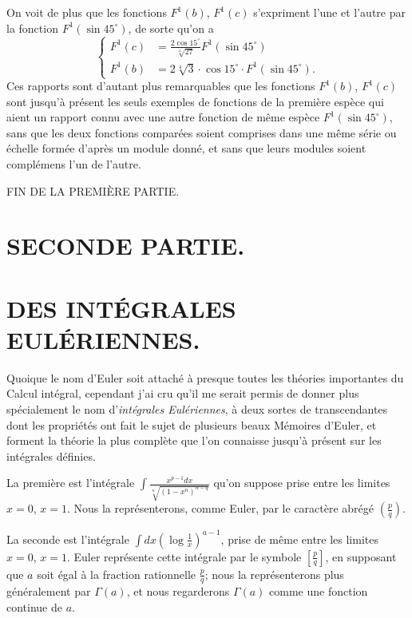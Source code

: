 \documentclass{article}
\begin{document}
On voit de plus que les fonctions $F^{1}(b)$, $F^{1}(c)$ s'expriment l'une et l'autre par la fonction $F^{1}(\sin 45^{\circ})$, de sorte qu'on a
\[ \left\{\begin{aligned} F^{1}(c)&=\frac{2\cos 15^{\circ}}{\sqrt[4]{27}}F^{1}(\sin 45^{\circ})\\ F^{1}(b)&=2\sqrt[4]{3}\cdot\cos 15^{\circ}\cdot F^{1}(\sin 45^{\circ}). \end{aligned}\right. \]
Ces rapports sont d'autant plus remarquables que les fonctions $F^{1}(b)$, $F^{1}(c)$ sont jusqu'à présent les seuls exemples de fonctions de la première espèce qui aient un rapport connu avec une autre fonction de même espèce $F^{1}(\sin 45^{\circ})$, sans que les deux fonctions comparées soient comprises dans une même série ou échelle formée d'après un module donné, et sans que leurs modules soient complémens l'un de l'autre.

FIN DE LA PREMIÈRE PARTIE.


\section*{SECONDE PARTIE.}

\section*{DES INTÉGRALES EULÉRIENNES.}

Quoique le nom d'Euler soit attaché à presque toutes les théories importantes du Calcul intégral, cependant j'ai cru qu'il me serait permis de donner plus spécialement le nom d'\emph{intégrales Eulériennes}, à deux sortes de transcendantes dont les propriétés ont fait le sujet de plusieurs beaux Mémoires d'Euler, et forment la théorie la plus complète que l'on connaisse jusqu'à présent sur les intégrales définies.

La première est l'intégrale $\displaystyle\int\frac{x^{p-1}dx}{\sqrt[n]{(1-x^{n})^{n-q}}}$ qu'on suppose prise entre les limites $x=0$, $x=1$. Nous la représenterons, comme Euler, par le caractère abrégé $\left(\frac{p}{q}\right)$.

La seconde est l'intégrale $\displaystyle\int dx\left(\log\frac{1}{x}\right)^{a-1}$, prise de même entre les limites $x=0$, $x=1$. Euler représente cette intégrale par le symbole $\left[\frac{p}{q}\right]$, en supposant que $a$ soit égal à la fraction rationnelle $\frac{p}{q}$; nous la représenterons plus généralement par $\Gamma(a)$, et nous regarderons $\Gamma(a)$ comme une fonction continue de $a$.
\end{document}
